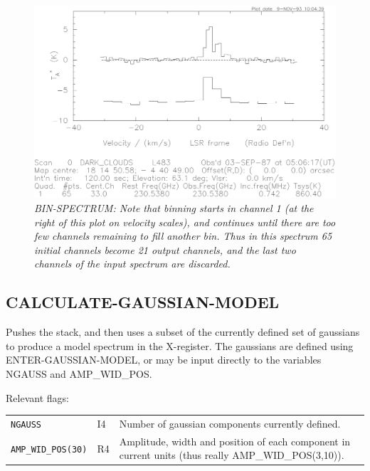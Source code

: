 \documentclass[11pt,twoside]{report}
\begin{document}
\begin{figure}[htbp]
\begin{center}
\includegraphics[scale=0.65]{bin-spec.ps}
\protect\parbox{5.5in}
{\caption[BIN]
{\sl
BIN-SPECTRUM: Note that binning starts in channel 1 (at the right of this
plot on velocity scales), and continues until there are too few channels
remaining to fill another bin. Thus in this spectrum 65 initial channels
become 21 output channels, and the last two channels of the input spectrum
are discarded.
\label{BIN}
}
}
\end{center}
\end{figure}

\subsection{CALCULATE-GAUSSIAN-MODEL} 

Pushes the stack, and then uses a subset of the currently defined set of
gaussians to produce a model spectrum in the X-register. The gaussians
are defined using ENTER-GAUSSIAN-MODEL, or may be input directly to the
variables NGAUSS and AMP\_WID\_POS.

Relevant flags:\\
\begin{tabular}{lll}
  \verb+NGAUSS+          & I4 & Number of gaussian components currently
                                defined. \\
  \verb+AMP_WID_POS(30)+ & R4 & \parbox[t]{4in}
                                {Amplitude, width and position of each
                                component in current units (thus really
                                AMP\_WID\_POS(3,10)).}
\end{tabular}
\end{document}
